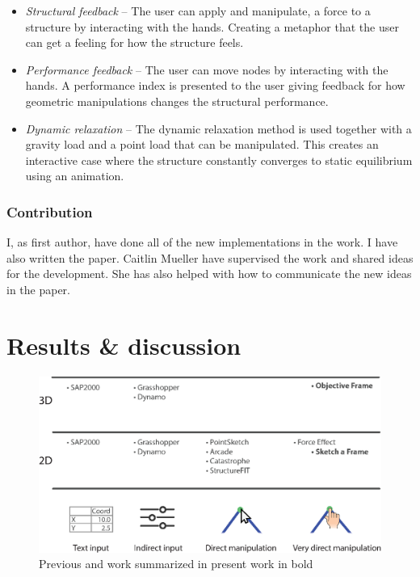 \begin{itemize} 
\item \textit{Structural feedback} – The user can apply and manipulate, a force to a structure by interacting with the hands. Creating a metaphor that the user can get a feeling for how the structure feels.
\item \textit{Performance feedback} – The user can move nodes by interacting with the hands. A performance index is presented to the user giving feedback for how geometric manipulations changes the structural performance.
\item \textit{Dynamic relaxation} – The dynamic relaxation method is used together with a gravity load and a point load that can be manipulated. This creates an interactive case where the structure constantly converges to static equilibrium using an animation.
\end{itemize} 

\subsection*{Contribution}

I, as first author, have done all of the new implementations in the work. I have also written the paper. Caitlin Mueller have supervised the work and shared ideas for the development. She has also helped with how to communicate the new ideas in the paper.

\chapter{Results \& discussion}
\label{ch:Results discussion}
\begin{figure}
  \includegraphics[width=330pt]{graphics/softwareReview.eps}
  \caption{Previous and work summarized in present work in bold}
  \label{fig:softwareReview}
\end{figure}

